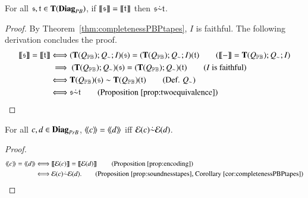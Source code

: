 \begin{corollary}\label{cor:completenessPBPtapes}
  For all $\mathfrak{s},\mathfrak{t} \in \mathbf{T}(\mathbf{Diag}_{PB})$, if $\left \llbracket \mathfrak{s} \right \rrbracket=\left \llbracket \mathfrak{t} \right \rrbracket$ then $\mathfrak{s} {\dot{\sim}} \mathfrak{t}$.
\end{corollary}
\begin{proof}
By Theorem~\ref{thm:completenessPBPtapes}, $I$ is faithful. The following derivation concludes the proof.
  \begin{align}
    \dsem{\s}=\dsem{\t} &\Longleftrightarrow (\CatT{Q_{\ThPB}}; Q_\eqsyn ; I) (\s)= (\CatT{Q_{\ThPB}}; Q_\eqsyn ; I) (\t) \tag{$\dsem{-}= \CatT{Q_{\ThPB}}; Q_\eqsyn ; I$}\\
    &\implies   (\CatT{Q_{\ThPB}}; Q_\eqsyn ) (\s)= (\CatT{Q_{\ThPB}}; Q_\eqsyn )(\t) \tag{$I$ is faithful} \\
    &\Longleftrightarrow \CatT{Q_{\ThPB}}  (\s) \eqsyn \CatT{Q_{\ThPB}}(\t) \tag{Def. $Q_\eqsyn$}\\
    &\Longleftrightarrow \s \dot{\sim} \t \tag{Proposition \ref{prop:twoequivalence}}
  \end{align}
\end{proof}


\begin{corollary}\label{cor:finale}
  For all $c,d \in \mathbf{Diag}_{PrB}$, $\langle\!\langle{c}\rangle\! \rangle=\langle\!\langle{d}\rangle\! \rangle$ iff $\mathcal{E}(c) {\dot{\sim}} \mathcal{E}(d)$.
\end{corollary}
\begin{proof}
  \begin{align}
    \osem{c}=\osem{d} &\Longleftrightarrow  \dsem{\encoding{c}}=\dsem{\encoding{d}} \tag{Proposition \ref{prop:encoding}}\\
    &\Longleftrightarrow \encoding{c} \eqsynbis \encoding{d}. \tag{Proposition \ref{prop:soundnesstapes}, Corollary \ref{cor:completenessPBPtapes}}
  \end{align}
\end{proof}